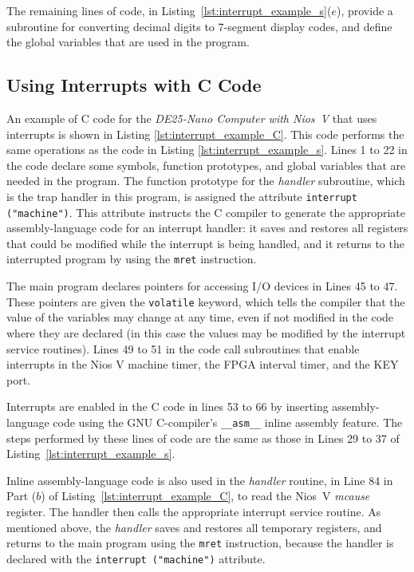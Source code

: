 \documentclass[11pt, twoside, pdftex]{article}
\newcommand{\systemNameFull}{DE25-Nano Computer with Nios~V}
\begin{document}
The remaining lines of code, in Listing~\ref{lst:interrupt_example_s}($e$),
provide a subroutine for converting decimal digits to 7-segment display codes,
and define the global variables that are used in the program.

\subsection{Using Interrupts with C Code}

An example of C code for the {\it \systemNameFull} that uses interrupts is shown in 
Listing \ref{lst:interrupt_example_C}. This code performs the same operations as
the code in Listing \ref{lst:interrupt_example_s}. Lines 1 to 22 in the code declare some symbols, 
function prototypes, and global variables that are needed in the program. The function
prototype for the {\it handler} subroutine, which is the trap handler in this program, is
assigned the attribute \texttt{interrupt ("machine")}. This attribute instructs the C compiler 
to generate the appropriate assembly-language code for an interrupt handler: it saves and 
restores all registers that could be modified while the interrupt is being handled, and it 
returns to the interrupted program by using the \texttt{mret} instruction. 

The main program declares pointers for accessing I/O devices in Lines 45 to 47. These
pointers are given the \texttt{volatile} keyword, which tells the compiler that the
value of the variables may change at any time, even if not modified in the code where
they are declared (in this case the values may be modified by the interrupt service routines). 
Lines 49 to 51 in the code call subroutines that enable interrupts in the Nios V machine
timer, the FPGA interval timer, and the KEY port. 

Interrupts are enabled in the C code in lines 53 to 66 by inserting assembly-language code 
using the GNU C-compiler's \texttt{\_\_asm\_\_} inline assembly feature. The steps performed by
these lines of code are the same as those in Lines 29 to 37 of 
Listing~\ref{lst:interrupt_example_s}.

Inline assembly-language code is also used in the {\it handler} routine, in Line 84 in 
Part ($b$) of Listing~\ref{lst:interrupt_example_C}, to read the Nios~V {\it mcause} register.
The handler then calls the appropriate interrupt service routine. As mentioned above, the
{\it handler} saves and restores all temporary registers, and returns to the main program 
using the \texttt{mret} instruction, because the
handler is declared with the \texttt{interrupt ("machine")} attribute.
\end{document}
